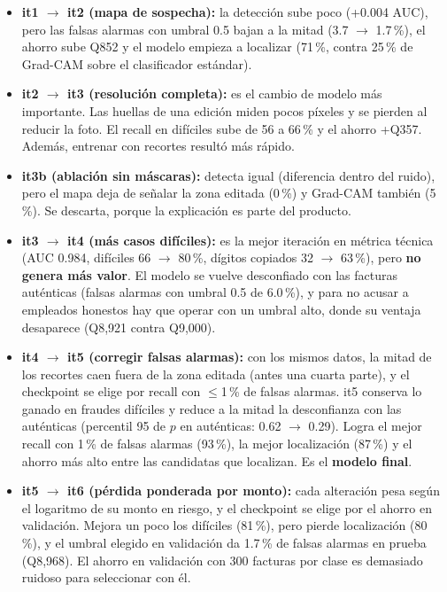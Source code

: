 \documentclass[11pt,letterpaper]{article}
\begin{document}
\begin{itemize}
  \item \textbf{it1 $\to$ it2 (mapa de sospecha):} la detección sube poco (+0.004 AUC), pero las falsas alarmas con umbral 0.5 bajan a la mitad (3.7 $\to$ 1.7\,\%), el ahorro sube Q852 y el modelo empieza a localizar (71\,\%, contra 25\,\% de Grad-CAM sobre el clasificador estándar).
  \item \textbf{it2 $\to$ it3 (resolución completa):} es el cambio de modelo más importante. Las huellas de una edición miden pocos píxeles y se pierden al reducir la foto. El recall en difíciles sube de 56 a 66\,\% y el ahorro +Q357. Además, entrenar con recortes resultó más rápido.
  \item \textbf{it3b (ablación sin máscaras):} detecta igual (diferencia dentro del ruido), pero el mapa deja de señalar la zona editada (0\,\%) y Grad-CAM también (5\,\%). Se descarta, porque la explicación es parte del producto.
  \item \textbf{it3 $\to$ it4 (más casos difíciles):} es la mejor iteración en métrica técnica (AUC 0.984, difíciles 66 $\to$ 80\,\%, dígitos copiados 32 $\to$ 63\,\%), pero \textbf{no genera más valor}. El modelo se vuelve desconfiado con las facturas auténticas (falsas alarmas con umbral 0.5 de 6.0\,\%), y para no acusar a empleados honestos hay que operar con un umbral alto, donde su ventaja desaparece (Q8,921 contra Q9,000).
  \item \textbf{it4 $\to$ it5 (corregir falsas alarmas):} con los mismos datos, la mitad de los recortes caen fuera de la zona editada (antes una cuarta parte), y el checkpoint se elige por recall con $\le$1\,\% de falsas alarmas. it5 conserva lo ganado en fraudes difíciles y reduce a la mitad la desconfianza con las auténticas (percentil 95 de $p$ en auténticas: 0.62 $\to$ 0.29). Logra el mejor recall con 1\,\% de falsas alarmas (93\,\%), la mejor localización (87\,\%) y el ahorro más alto entre las candidatas que localizan. Es el \textbf{modelo final}.
  \item \textbf{it5 $\to$ it6 (pérdida ponderada por monto):} cada alteración pesa según el logaritmo de su monto en riesgo, y el checkpoint se elige por el ahorro en validación. Mejora un poco los difíciles (81\,\%), pero pierde localización (80\,\%), y el umbral elegido en validación da 1.7\,\% de falsas alarmas en prueba (Q8,968). El ahorro en validación con 300 facturas por clase es demasiado ruidoso para seleccionar con él.
\end{itemize}
\end{document}

